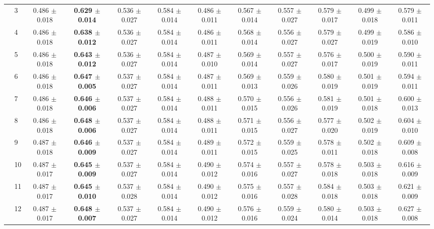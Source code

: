\begin{table*}[t]
{\begin{tabular}{%
  ll
  @{\quad}
  c@{\hskip 4pt}c
  @{\quad\quad}
  c@{\hskip 4pt}c
  @{\quad\quad}
  c@{\hskip 4pt}c
  @{\quad\quad}
  c@{\hskip 4pt}c
  @{\quad\quad}
  c@{\hskip 4pt}c
}
        & 3 & 0.486 $\pm$ 0.018 & \textbf{0.629 $\pm$ 0.014} & 0.536 $\pm$ 0.027 & 0.584 $\pm$ 0.014 & 0.486 $\pm$ 0.011 & 0.567 $\pm$ 0.014 & 0.557 $\pm$ 0.027 & 0.579 $\pm$ 0.017 & 0.499 $\pm$ 0.018 & 0.579 $\pm$ 0.011 \\
        & 4 & 0.486 $\pm$ 0.018 & \textbf{0.638 $\pm$ 0.012} & 0.536 $\pm$ 0.027 & 0.584 $\pm$ 0.014 & 0.486 $\pm$ 0.011 & 0.568 $\pm$ 0.014 & 0.556 $\pm$ 0.027 & 0.579 $\pm$ 0.027 & 0.499 $\pm$ 0.019 & 0.586 $\pm$ 0.010 \\
        & 5 & 0.486 $\pm$ 0.018 & \textbf{0.643 $\pm$ 0.012} & 0.536 $\pm$ 0.027 & 0.584 $\pm$ 0.014 & 0.487 $\pm$ 0.010 & 0.569 $\pm$ 0.014 & 0.557 $\pm$ 0.027 & 0.576 $\pm$ 0.017 & 0.500 $\pm$ 0.019 & 0.590 $\pm$ 0.011 \\
        & 6 & 0.486 $\pm$ 0.018 & \textbf{0.647 $\pm$ 0.005} & 0.537 $\pm$ 0.027 & 0.584 $\pm$ 0.014 & 0.487 $\pm$ 0.011 & 0.569 $\pm$ 0.013 & 0.559 $\pm$ 0.026 & 0.580 $\pm$ 0.019 & 0.501 $\pm$ 0.019 & 0.594 $\pm$ 0.011 \\
        & 7 & 0.486 $\pm$ 0.018 & \textbf{0.646 $\pm$ 0.006} & 0.537 $\pm$ 0.027 & 0.584 $\pm$ 0.014 & 0.488 $\pm$ 0.011 & 0.570 $\pm$ 0.015 & 0.556 $\pm$ 0.026 & 0.581 $\pm$ 0.019 & 0.501 $\pm$ 0.018 & 0.600 $\pm$ 0.013 \\
        & 8 & 0.486 $\pm$ 0.018 & \textbf{0.648 $\pm$ 0.006} & 0.537 $\pm$ 0.027 & 0.584 $\pm$ 0.014 & 0.488 $\pm$ 0.011 & 0.571 $\pm$ 0.015 & 0.556 $\pm$ 0.027 & 0.577 $\pm$ 0.020 & 0.502 $\pm$ 0.019 & 0.604 $\pm$ 0.010 \\
        & 9 & 0.487 $\pm$ 0.018 & \textbf{0.646 $\pm$ 0.009} & 0.537 $\pm$ 0.027 & 0.584 $\pm$ 0.014 & 0.489 $\pm$ 0.011 & 0.572 $\pm$ 0.015 & 0.559 $\pm$ 0.025 & 0.578 $\pm$ 0.011 & 0.502 $\pm$ 0.018 & 0.609 $\pm$ 0.008 \\
        & 10 & 0.487 $\pm$ 0.017 & \textbf{0.645 $\pm$ 0.009} & 0.537 $\pm$ 0.027 & 0.584 $\pm$ 0.014 & 0.490 $\pm$ 0.012 & 0.574 $\pm$ 0.016 & 0.557 $\pm$ 0.027 & 0.578 $\pm$ 0.018 & 0.503 $\pm$ 0.018 & 0.616 $\pm$ 0.009 \\
        & 11 & 0.487 $\pm$ 0.017 & \textbf{0.645 $\pm$ 0.010} & 0.537 $\pm$ 0.028 & 0.584 $\pm$ 0.014 & 0.490 $\pm$ 0.012 & 0.575 $\pm$ 0.016 & 0.557 $\pm$ 0.028 & 0.584 $\pm$ 0.018 & 0.503 $\pm$ 0.018 & 0.621 $\pm$ 0.009 \\
        & 12 & 0.487 $\pm$ 0.017 & \textbf{0.648 $\pm$ 0.007} & 0.537 $\pm$ 0.027 & 0.584 $\pm$ 0.014 & 0.490 $\pm$ 0.012 & 0.576 $\pm$ 0.016 & 0.559 $\pm$ 0.024 & 0.580 $\pm$ 0.014 & 0.503 $\pm$ 0.018 & 0.627 $\pm$ 0.008 \\

\end{tabular}}
\end{table*}
